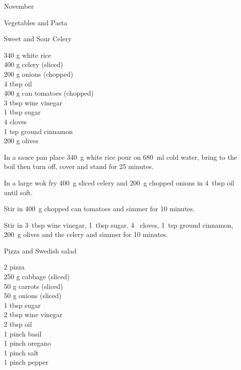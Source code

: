 \begin{menu}{November}
\begin{recipe}{2}{Vegetables and Pasta}
\begin{instructions}
    \end{instructions}
    \end{recipe}%
  
    \begin{recipe}{2}{Sweet and Sour Celery}%
		\begin{ingredients}
		340 g white rice  \\
	400 g celery (sliced) \\
	200 g onions (chopped) \\
	4 tbsp oil  \\
	400 g can tomatoes (chopped) \\
	3 tbsp wine vinegar  \\
	1 tbsp sugar  \\
	4  cloves  \\
	1 tsp ground cinnamon  \\
	200 g olives  \\
	
		\end{ingredients}
	
	
    \begin{instructions}
    \item 
    In a
    sauce pan
    place
    340~g  white rice
    pour on
    680~ml  cold water,
    bring to the boil then turn off, cover and stand for 25 minutes.
  \item 
        In a large wok fry
        400~g sliced celery
        and
        200~g chopped onions
        in
        4~tbsp  oil
        until soft.
      \item 
        Stir in
        400~g chopped can tomatoes
        and simmer for 10 minutes.
      \item 
        Stir in
        3~tbsp  wine vinegar,
        1~tbsp  sugar,
        4~  cloves,
        1~tsp  ground cinnamon,
        200~g  olives
        and the celery
        and simmer for 10 minutes.
      
    \end{instructions}
    \end{recipe}%
  
    \begin{recipe}{1}{Pizza and Swedish salad}%
		\begin{ingredients}
		2  pizza  \\
	250 g cabbage (sliced) \\
	50 g carrots (sliced) \\
	50 g onions (sliced) \\
	1 tbsp sugar  \\
	2 tbsp wine vinegar  \\
	2 tbsp oil  \\
	1 pinch basil  \\
	1 pinch oregano  \\
	1 pinch salt  \\
	1 pinch pepper  \\
	

\end{ingredients}
\end{recipe}
\end{menu}
